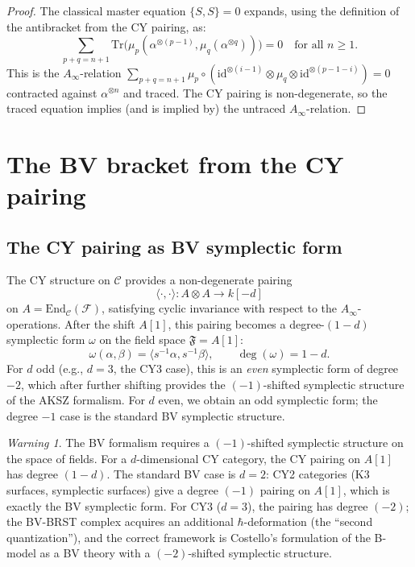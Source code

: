\documentclass[11pt]{amsart}
\theoremstyle{plain}
\theoremstyle{definition}
\theoremstyle{remark}
\newtheorem{warning}[theorem]{Warning}
\newcommand{\Ainf}{A_\infty}
\newcommand{\Tr}{\mathrm{Tr}}
\newcommand{\End}{\mathrm{End}}
\newcommand{\id}{\mathrm{id}}
\newcommand{\cC}{\mathcal{C}}
\newcommand{\cF}{\mathcal{F}}
\begin{document}
\begin{proof}
The classical master equation $\{S, S\} = 0$ expands, using the definition of the antibracket from the CY pairing, as:
\[
 \sum_{p+q = n+1} \Tr\bigl(\mu_p(\alpha^{\otimes (p-1)}, \mu_q(\alpha^{\otimes q}))\bigr) = 0 \quad \text{for all } n \geq 1.
\]
This is the $\Ainf$-relation $\sum_{p+q=n+1} \mu_p \circ (\id^{\otimes (i-1)} \otimes \mu_q \otimes \id^{\otimes (p-1-i)}) = 0$ contracted against $\alpha^{\otimes n}$ and traced. The CY pairing is non-degenerate, so the traced equation implies (and is implied by) the untraced $\Ainf$-relation.
\end{proof}

\section{The BV bracket from the CY pairing}
\label{sec:bv-bracket}

\subsection{The CY pairing as BV symplectic form}
\label{subsec:cy-pairing-bv}

The CY structure on $\cC$ provides a non-degenerate pairing
\begin{equation}\label{eq:cy-pairing}
 \langle \cdot, \cdot \rangle \colon A \otimes A \longrightarrow k[-d]
\end{equation}
on $A = \End_\cC(\cF)$, satisfying cyclic invariance with respect to the $\Ainf$-operations. After the shift $A[1]$, this pairing becomes a degree-$(1-d)$ symplectic form $\omega$ on the field space $\mathfrak{F} = A[1]$:
\begin{equation}\label{eq:bv-symplectic}
 \omega(\alpha, \beta) = \langle s^{-1}\alpha, s^{-1}\beta \rangle, \qquad \deg(\omega) = 1-d.
\end{equation}
For $d$ odd (e.g., $d = 3$, the CY3 case), this is an \emph{even} symplectic form of degree $-2$, which after further shifting provides the $(-1)$-shifted symplectic structure of the AKSZ formalism. For $d$ even, we obtain an odd symplectic form; the degree $-1$ case is the standard BV symplectic structure.

\begin{warning}
The BV formalism requires a $(-1)$-shifted symplectic structure on the space of fields. For a $d$-dimensional CY category, the CY pairing on $A[1]$ has degree $(1-d)$. The standard BV case is $d = 2$: CY2 categories (K3 surfaces, symplectic surfaces) give a degree $(-1)$ pairing on $A[1]$, which is exactly the BV symplectic form. For CY3 ($d = 3$), the pairing has degree $(-2)$; the BV-BRST complex acquires an additional $\hbar$-deformation (the ``second quantization''), and the correct framework is Costello's formulation of the B-model as a BV theory with a $(-2)$-shifted symplectic structure.
\end{warning}
\end{document}

